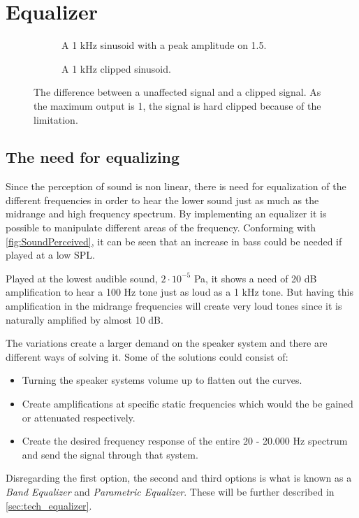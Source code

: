 \section{Equalizer}\label{sec:tech_equalizer}


\begin{figure}[H]
\centering
\begin{subfigure}[t]{0.47\textwidth}
	
	\caption{A 1 kHz sinusoid with a peak amplitude on 1.5.}
	\label{fig:parametric_q}
\end{subfigure}
\hspace{6mm} 
\begin{subfigure}[t]{0.47\textwidth}
	
	\caption{A 1 kHz clipped sinusoid.}
	\label{fig:parametric_db}
\end{subfigure}
\caption{The difference between a unaffected signal and a clipped signal. As the maximum output is 1, the signal is hard clipped because of the limitation.}
\label{fig:audioclipping}
\end{figure}


\subsection{The need for equalizing}

Since the perception of sound is non linear, there is need for equalization of the different frequencies in order to hear the lower sound just as much as the midrange and high frequency spectrum. By implementing an equalizer it is possible to manipulate different areas of the frequency. Conforming with \autoref{fig:SoundPerceived}, it can be seen that an increase in bass could be needed if played at a low \gls{SPL}.

Played at the lowest audible sound, $2\cdot 10^{-5}$ Pa, it shows a need of 20 dB amplification to hear a 100 Hz tone just as loud as a 1 kHz tone. But having this amplification in the midrange frequencies will create very loud tones since it is naturally amplified by almost 10 dB. 

The variations create a larger demand on the speaker system and there are different ways of solving it. Some of the solutions could consist of:

\begin{itemize}
\item Turning the speaker systems volume up to flatten out the curves.
\item Create amplifications at specific static frequencies which would the be gained or attenuated respectively.
\item Create the desired frequency response of the entire 20 - 20.000 Hz spectrum and send the signal through that system.
\end{itemize} 

Disregarding the first option, the second and third options is what is known as a \textit{Band Equalizer} and \textit{Parametric Equalizer}. These will be further described in \autoref{sec:tech_equalizer}.
